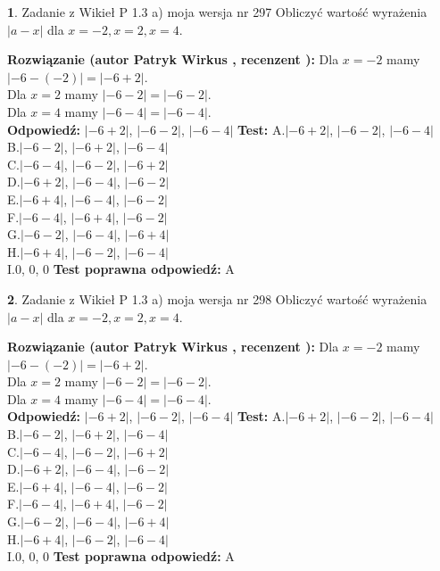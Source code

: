 \documentclass[12pt, a4paper]{article}
\theoremstyle{definition} %
\newtheorem{zad}{}
\newcommand{\zadStart}[1]{\begin{zad}#1\newline}
\newcommand{\zadStop}{\end{zad}}
\newcommand{\rozwStart}[2]{\noindent \textbf{Rozwiązanie (autor #1 , recenzent #2): }\newline}
\newcommand{\rozwStop}{\newline}
\newcommand{\odpStart}{\noindent \textbf{Odpowiedź:}\newline}
\newcommand{\odpStop}{\newline}
\newcommand{\testStart}{\noindent \textbf{Test:}\newline}
\newcommand{\testStop}{\newline}
\newcommand{\kluczStart}{\noindent \textbf{Test poprawna odpowiedź:}\newline}
\newcommand{\kluczStop}{\newline}
\begin{document}
\zadStart{Zadanie z Wikieł P 1.3 a) moja wersja nr 297}
Obliczyć wartość wyrażenia $|a - x|$ dla $x=-2,x=2,x=4$.
\zadStop
\rozwStart{Patryk Wirkus}{}
Dla $x = -2$ mamy $|-6 - (-2)| = |-6 + 2|$.\\
Dla $x = 2$ mamy $|-6 - 2| = |-6 - 2|$.\\
Dla $x = 4$ mamy $|-6 - 4| = |-6 - 4|$.\\
\rozwStop
\odpStart
$|-6 + 2|$, $|-6 - 2|$, $|-6 - 4|$
\odpStop
\testStart
A.$|-6 + 2|$, $|-6 - 2|$, $|-6 - 4|$\\
B.$|-6 - 2|$, $|-6 + 2|$, $|-6 - 4|$\\
C.$|-6 - 4|$, $|-6 - 2|$, $|-6 + 2|$\\
D.$|-6 + 2|$, $|-6 - 4|$, $|-6 - 2|$\\
E.$|-6 + 4|$, $|-6 - 4|$, $|-6 - 2|$\\
F.$|-6 - 4|$, $|-6 + 4|$, $|-6 - 2|$\\
G.$|-6 - 2|$, $|-6 - 4|$, $|-6 + 4|$\\
H.$|-6 + 4|$, $|-6 - 2|$, $|-6 - 4|$\\
I.$0$, $0$, $0$
\testStop
\kluczStart
A
\kluczStop



\zadStart{Zadanie z Wikieł P 1.3 a) moja wersja nr 298}
Obliczyć wartość wyrażenia $|a - x|$ dla $x=-2,x=2,x=4$.
\zadStop
\rozwStart{Patryk Wirkus}{}
Dla $x = -2$ mamy $|-6 - (-2)| = |-6 + 2|$.\\
Dla $x = 2$ mamy $|-6 - 2| = |-6 - 2|$.\\
Dla $x = 4$ mamy $|-6 - 4| = |-6 - 4|$.\\
\rozwStop
\odpStart
$|-6 + 2|$, $|-6 - 2|$, $|-6 - 4|$
\odpStop
\testStart
A.$|-6 + 2|$, $|-6 - 2|$, $|-6 - 4|$\\
B.$|-6 - 2|$, $|-6 + 2|$, $|-6 - 4|$\\
C.$|-6 - 4|$, $|-6 - 2|$, $|-6 + 2|$\\
D.$|-6 + 2|$, $|-6 - 4|$, $|-6 - 2|$\\
E.$|-6 + 4|$, $|-6 - 4|$, $|-6 - 2|$\\
F.$|-6 - 4|$, $|-6 + 4|$, $|-6 - 2|$\\
G.$|-6 - 2|$, $|-6 - 4|$, $|-6 + 4|$\\
H.$|-6 + 4|$, $|-6 - 2|$, $|-6 - 4|$\\
I.$0$, $0$, $0$
\testStop
\kluczStart
A
\kluczStop
\end{document}
